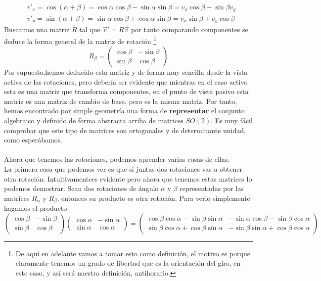 \documentclass[12pt]{article}
\begin{document}
\begin{equation*}
    \begin{split}
        & v'_x=\cos(\alpha +\beta) =\cos\alpha \cos\beta -\sin\alpha\sin\beta = v_x \cos\beta -\sin\beta v_y \\ 
        & v'_y=\sin(\alpha +\beta) =\sin\alpha\cos\beta +\cos\alpha\sin\beta = v_x\sin\beta + v_y\cos\beta
    \end{split}
\end{equation*}
Buscamos una matriz $\hat R$ tal que $\vec v' = R \vec v$ por tanto comparando componentes se deduce la forma general de la matriz de rotación \footnote{De aquí en adelante vamos a tomar esto como definición, el motivo es porque claramente tenemos un grado de libertad que es la orientación del giro, en este caso, y así será nuestra definición, antihorario.}
\begin{equation}
    R_\beta=\begin{pmatrix}
        \cos \beta & -\sin\beta \\ \sin\beta & \cos \beta
    \end{pmatrix}
\end{equation}
Por supuesto,hemos deducido esta matriz y de forma muy sencilla desde la vista activa de las rotaciones, pero debería ser evidente que mientras en el caso activo esta es una matriz que transforma componentes, en el punto de vista pasivo esta matriz es una matriz de cambio de base, pero es la misma matriz. Por tanto, hemos encontrado por simple geometría una forma de \textbf{representar} el conjunto algebraico y definido de forma abstracta arriba de matrices $SO(2)$. Es muy fácil comprobar que este tipo de matrices son ortogonales y de determinante unidad, como esperábamos. \\\\ Ahora que tenemos las rotaciones, podemos aprender varias cosas de ellas.\\
La primera cosa que podemos ver es que si juntas dos rotaciones vas a obtener otra rotación. Intuitivamentees evidente pero ahora que tenemos estas matrices lo podemos demostrar. Sean dos rotaciones de ángulo $\alpha$ y $\beta$ representadas por las matrices $R_\alpha$ y $R_\beta$, entonces su producto es otra rotación. Para verlo simplemente hagamos el producto 
\begin{equation*}
      \begin{pmatrix}
        \cos \beta & -\sin\beta \\ \sin\beta & \cos \beta
    \end{pmatrix} \begin{pmatrix}
        \cos \alpha & -\sin\alpha\\ \sin\alpha & \cos \alpha
    \end{pmatrix} =\begin{pmatrix}
        \cos\beta \cos \alpha -\sin\beta \sin\alpha & -\sin\alpha \cos\beta -\sin\beta\cos \alpha \\
        \sin\beta\cos\alpha +\cos\beta \sin \alpha & -\sin\beta\sin\alpha +\cos\beta\cos\alpha 
    \end{pmatrix}
\end{equation*}
\end{document}
